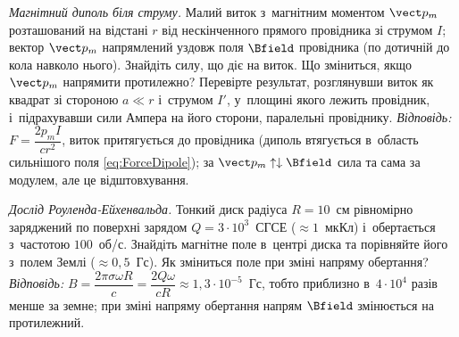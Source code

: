 \begin{problem}\label{prb:DipoleNearWire}
	\emph{Магнітний диполь біля струму.} Малий виток з~магнітним моментом $\vect p_m$
	розташований на відстані $r$ від нескінченного прямого провідника зі струмом $I$;
	вектор $\vect p_m$ напрямлений уздовж поля $\Bfield$ провідника (по дотичній до кола
	навколо нього). Знайдіть силу, що діє на виток. Що зміниться, якщо $\vect p_m$
	напрямити протилежно? Перевірте результат, розглянувши виток як квадрат зі стороною
	$a\ll r$ і~струмом $I'$, у~площині якого лежить провідник, і~підрахувавши сили Ампера
	на його сторони, паралельні провіднику. \emph{Відповідь:} $F=\dfrac{2p_mI}{cr^2}$,
	виток притягується до провідника (диполь втягується в~область сильнішого поля
	\eqref{eq:ForceDipole}); за $\vect p_m\uparrow\downarrow\Bfield$ сила та сама за
	модулем, але це відштовхування.
\end{problem}

\begin{problem}\label{prb:RowlandDisk}
	\emph{Дослід Роуленда-Ейхенвальда.} Тонкий диск радіуса $R = 10$~см рівномірно
	заряджений по поверхні зарядом $Q = 3\cdot10^{3}$~СГСЕ ($\approx 1$~мкКл)
	і~обертається з~частотою $100$~об/с. Знайдіть магнітне поле в~центрі диска та
	порівняйте його з~полем Землі ($\approx 0{,}5$~Гс). Як зміниться поле при зміні
	напряму обертання? \emph{Відповідь:} $B = \dfrac{2\pi\sigma\omega R}{c} =
		\dfrac{2Q\omega}{cR} \approx 1{,}3\cdot10^{-5}$~Гс, тобто приблизно в~$4\cdot10^{4}$
	разів менше за земне; при зміні напряму обертання напрям $\Bfield$ змінюється на
	протилежний.
\end{problem}

